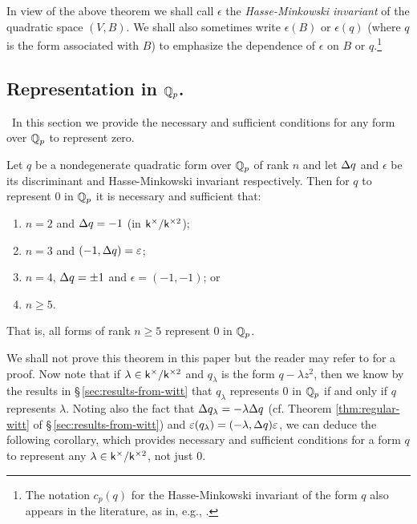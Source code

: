 In view of the above theorem we shall call \(\epsilon\) the \emph{Hasse-Minkowski invariant} of the quadratic space \((V, B)\). We shall also sometimes write \(\epsilon(B)\) or \(\epsilon(q)\) (where \(q\) is the form associated with \(B\)) to emphasize the dependence of \(\epsilon\) on \(B\) or \(q\).\footnote{The notation \(c_p(q)\) for the Hasse-Minkowski invariant of the form \(q\) also appears in the literature, as in, e.g., \cite{jones1950arithmetic,cassels2008rational}.}

\subsection{Representation in \(\mathbb{Q}_p\).}~In this section we provide the necessary and sufficient conditions for any form over \(\mathbb{Q}_p\) to represent zero.\label{sec:representation-in-qp-sec}

\begin{theoremx}\label{thm:rep-in-rationals-p}
    Let \(q\) be a nondegenerate quadratic form over \(\mathbb{Q}_p\) of rank \(n\) and let \({\Delta} q\) and \(\epsilon\) be its discriminant and Hasse-Minkowski invariant respectively. Then for \(q\) to represent \(0\) in \(\mathbb{Q}_p\) it is necessary and sufficient that:

    \smallskip

    \begin{enumerate}[nosep, label=(\alph*)]
        \item \(n = 2\) and \({\Delta} q = -1\) (in \(\mathsf{k}^{\times}/\mathsf{k}^{\times2}\));
        \item \(n = 3\) and \((-1, {\Delta} q) = \varepsilon\);
        \item \(n = 4\), \({\Delta} q = \pm 1\) and \(\epsilon = (-1, -1)\); or
        \item \(n \geq 5\).
    \end{enumerate}
    That is, all forms of rank \(n \geq 5\) represent \(0\) in \(\mathbb{Q}_p\).
\end{theoremx}

We shall not prove this theorem in this paper but the reader may refer to \cite[pp.~36--39]{serre2012course} for a proof. Now note that if \(\lambda \in \mathsf{k}^{\times}/\mathsf{k}^{\times2}\) and \(q_{\lambda}\) is the form \(q - \lambda z^2\), then we know by the results in \S\,\ref{sec:results-from-witt} that \(q_{\lambda}\) represents \(0\) in \(\mathbb{Q}_p\) if and only if \(q\) represents \(\lambda\). Noting also the fact that \({\Delta} q_{\lambda} = -\lambda {\Delta} q\) (cf. Theorem \ref{thm:regular-witt} of \S\,\ref{sec:results-from-witt}) and \(\varepsilon(q_\lambda) = (-\lambda, {\Delta} q)\varepsilon\), we can deduce the following corollary, which provides necessary and sufficient conditions for a form \(q\) to represent any \(\lambda \in \mathsf{k}^{\times}/\mathsf{k}^{\times2}\), not just \(0\).

